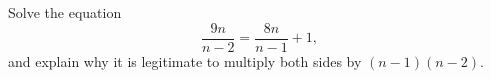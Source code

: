 Solve the equation
\[
\dfrac{9n}{n-2}=\dfrac{8n}{n-1}+1 ,
\]
and explain why it is legitimate to multiply both sides by $(n-1)(n-2)$.
